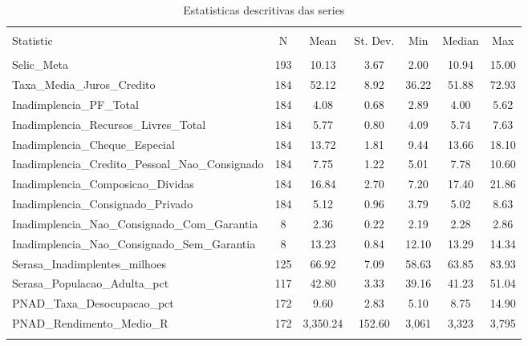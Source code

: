 
\begin{table}[!htbp] \centering 
  \caption{Estatisticas descritivas das series} 
  \label{tab:estatisticas_series} 
\begin{tabular}{@{\extracolsep{5pt}}lcccccc} 
\\[-1.8ex]\hline 
\hline \\[-1.8ex] 
Statistic & \multicolumn{1}{c}{N} & \multicolumn{1}{c}{Mean} & \multicolumn{1}{c}{St. Dev.} & \multicolumn{1}{c}{Min} & \multicolumn{1}{c}{Median} & \multicolumn{1}{c}{Max} \\ 
\hline \\[-1.8ex] 
Selic\_Meta & 193 & 10.13 & 3.67 & 2.00 & 10.94 & 15.00 \\ 
Taxa\_Media\_Juros\_Credito & 184 & 52.12 & 8.92 & 36.22 & 51.88 & 72.93 \\ 
Inadimplencia\_PF\_Total & 184 & 4.08 & 0.68 & 2.89 & 4.00 & 5.62 \\ 
Inadimplencia\_Recursos\_Livres\_Total & 184 & 5.77 & 0.80 & 4.09 & 5.74 & 7.63 \\ 
Inadimplencia\_Cheque\_Especial & 184 & 13.72 & 1.81 & 9.44 & 13.66 & 18.10 \\ 
Inadimplencia\_Credito\_Pessoal\_Nao\_Consignado & 184 & 7.75 & 1.22 & 5.01 & 7.78 & 10.60 \\ 
Inadimplencia\_Composicao\_Dividas & 184 & 16.84 & 2.70 & 7.20 & 17.40 & 21.86 \\ 
Inadimplencia\_Consignado\_Privado & 184 & 5.12 & 0.96 & 3.79 & 5.02 & 8.63 \\ 
Inadimplencia\_Nao\_Consignado\_Com\_Garantia & 8 & 2.36 & 0.22 & 2.19 & 2.28 & 2.86 \\ 
Inadimplencia\_Nao\_Consignado\_Sem\_Garantia & 8 & 13.23 & 0.84 & 12.10 & 13.29 & 14.34 \\ 
Serasa\_Inadimplentes\_milhoes & 125 & 66.92 & 7.09 & 58.63 & 63.85 & 83.93 \\ 
Serasa\_Populacao\_Adulta\_pct & 117 & 42.80 & 3.33 & 39.16 & 41.23 & 51.04 \\ 
PNAD\_Taxa\_Desocupacao\_pct & 172 & 9.60 & 2.83 & 5.10 & 8.75 & 14.90 \\ 
PNAD\_Rendimento\_Medio\_R & 172 & 3,350.24 & 152.60 & 3,061 & 3,323 & 3,795 \\ 
\hline \\[-1.8ex] 
\end{tabular} 
\end{table} 
